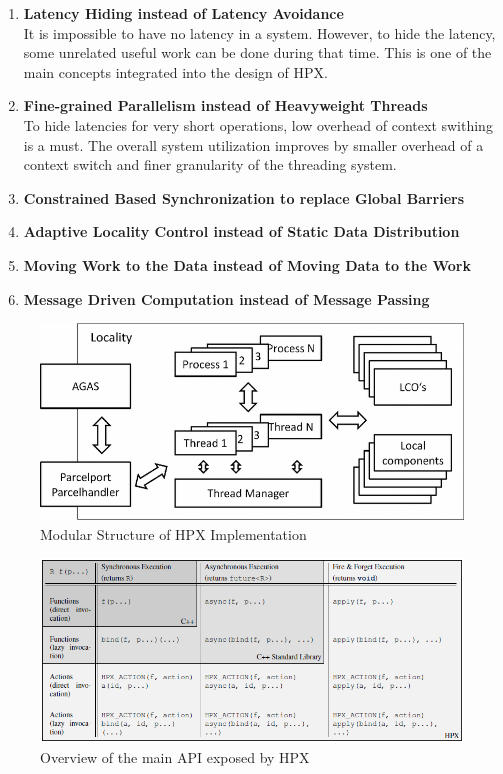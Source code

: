 \begin{enumerate}
\item \textbf{Latency Hiding instead of Latency Avoidance}\\
  It is impossible to have no latency in a system. However, to hide the latency, some unrelated useful work can be done during that time. This is one of the main concepts integrated into the design of HPX.
  
\item \textbf{Fine-grained Parallelism instead of Heavyweight Threads}\\
  To hide latencies for very short operations, low overhead of context swithing is a must. The overall system utilization improves by smaller overhead of a context switch and finer granularity of the threading system. 
\item \textbf{Constrained Based Synchronization to replace Global Barriers}\\
  
\item \textbf{Adaptive Locality Control instead of Static Data Distribution}\\
  
\item \textbf{Moving Work to the Data instead of Moving Data to the Work}\\
  
\item \textbf{Message Driven Computation instead of Message Passing}\\
  
\end{enumerate}

\begin{figure}[h!]
\centering
\includegraphics[scale=0.4]{images/hpx.png}
\caption{Modular Structure of HPX Implementation~\cite{kaiser2009parallex}}
\label{fig:hpx-structure}
\end{figure}

\begin{figure}[h!]
\centering
\includegraphics[scale=0.7]{images/hpx_the_api.png}
\caption{Overview of the main API exposed by HPX~\cite{kaiser2014hpx}}
\label{fig:hpx-api}
\end{figure}
